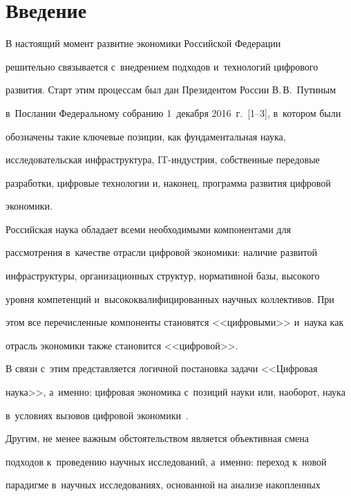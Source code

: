      \vspace*{-18pt} 

     

\section{Введение}



     В настоящий момент развитие экономики Российской Федерации 

решительно связывается с~внедрением подходов и~технологий цифрового 

развития. Старт этим процессам был дан Президентом России В.\,В.~Путиным 

в~Послании Федеральному собранию 1~декабря 2016~г.~[1--3], в~котором были 

обозначены такие ключевые позиции, как фундаментальная наука, 

исследовательская инфраструктура, IT-ин\-дуст\-рия, собственные передовые 

разработки, цифровые технологии и, наконец, программа развития цифровой 

экономики. 

     

     Российская наука обладает всеми необходимыми компонентами для 

рассмотрения в~качестве отрасли цифровой экономики: наличие развитой 

инфраструктуры, организационных структур, нормативной базы, высокого 

уровня компетенций и~высококвалифицированных научных коллективов. При 

этом все перечисленные компоненты становятся <<цифровыми>> и~наука как 

отрасль экономики также становится <<цифровой>>.

     

     В связи с~этим представляется логичной постановка задачи <<Цифровая 

наука>>, а~именно: цифровая экономика с~позиций науки или, наоборот, наука 

в~условиях вызовов цифровой экономики~\cite{4-zks}. 

     

     Другим, не менее важным обстоятельством является объективная смена 

подходов к~проведению научных исследований, а~именно: переход к~новой 

парадигме в~научных исследованиях, основанной на анализе накопленных 


